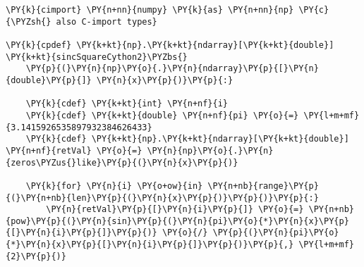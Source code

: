 \begin{Verbatim}[commandchars=\\\{\}]
\PY{k}{cimport} \PY{n+nn}{numpy} \PY{k}{as} \PY{n+nn}{np} \PY{c}{\PYZsh{} also C-import types}

\PY{k}{cpdef} \PY{k+kt}{np}.\PY{k+kt}{ndarray}[\PY{k+kt}{double}] \PY{k+kt}{sincSquareCython2}\PYZbs{}
    \PY{p}{(}\PY{n}{np}\PY{o}{.}\PY{n}{ndarray}\PY{p}{[}\PY{n}{double}\PY{p}{]} \PY{n}{x}\PY{p}{)}\PY{p}{:}

    \PY{k}{cdef} \PY{k+kt}{int} \PY{n+nf}{i}
    \PY{k}{cdef} \PY{k+kt}{double} \PY{n+nf}{pi} \PY{o}{=} \PY{l+m+mf}{3.1415926535897932384626433}
    \PY{k}{cdef} \PY{k+kt}{np}.\PY{k+kt}{ndarray}[\PY{k+kt}{double}] \PY{n+nf}{retVal} \PY{o}{=} \PY{n}{np}\PY{o}{.}\PY{n}{zeros\PYZus{}like}\PY{p}{(}\PY{n}{x}\PY{p}{)}

    \PY{k}{for} \PY{n}{i} \PY{o+ow}{in} \PY{n+nb}{range}\PY{p}{(}\PY{n+nb}{len}\PY{p}{(}\PY{n}{x}\PY{p}{)}\PY{p}{)}\PY{p}{:}
        \PY{n}{retVal}\PY{p}{[}\PY{n}{i}\PY{p}{]} \PY{o}{=} \PY{n+nb}{pow}\PY{p}{(}\PY{n}{sin}\PY{p}{(}\PY{n}{pi}\PY{o}{*}\PY{n}{x}\PY{p}{[}\PY{n}{i}\PY{p}{]}\PY{p}{)} \PY{o}{/} \PY{p}{(}\PY{n}{pi}\PY{o}{*}\PY{n}{x}\PY{p}{[}\PY{n}{i}\PY{p}{]}\PY{p}{)}\PY{p}{,} \PY{l+m+mf}{2}\PY{p}{)}
\end{Verbatim}
